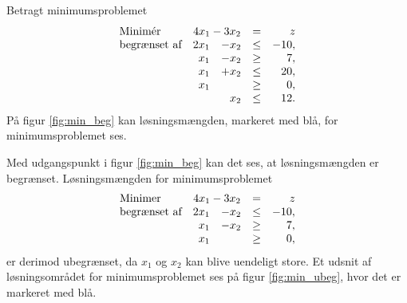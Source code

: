 \begin{eks}
\label{eks:min_lin}
Betragt minimumsproblemet
%
\begin{align*}
\begin{array}{lrrlr}
\text{Minimér}		&	\multicolumn{2}{c}{4x_1-3x_2}  &=	&z\\
\text{begrænset af}	&2x_1& - x_2			&\leq 	&-10,\\
					&x_1& - x_2				&\geq	& 7,\\
					&x_1& + x_2				&\leq	& 20,\\
					&x_1&					&\geq	& 0,\\
					& &x_2					&\leq	& 12.
\end{array}
\end{align*}
%
På figur \ref{fig:min_beg} kan løsningsmængden, markeret med blå, for minimumsproblemet ses.
%

\noindent
%
Med udgangspunkt i figur \ref{fig:min_beg} kan det ses, at løsningsmængden er begrænset.
% 
Løsningsmængden for minimumsproblemet
%
\begin{align*}
\begin{array}{lrrlr}
\text{Minimer}		&\multicolumn{2}{c}{4x_1-3x_2}&=  &z\\
\text{begrænset af}	&2x_1& - x_2			&\leq 	&-10,\\
					&x_1& - x_2				&\geq	& 7,\\
					&x_1&					&\geq	& 0,
\end{array}
\end{align*}
er derimod ubegrænset, da $x_1$ og $x_2$ kan blive uendeligt store. 
Et udsnit af løsningsområdet for minimumsproblemet ses på figur \ref{fig:min_ubeg}, hvor det er markeret med blå.
%

%
\end{eks}